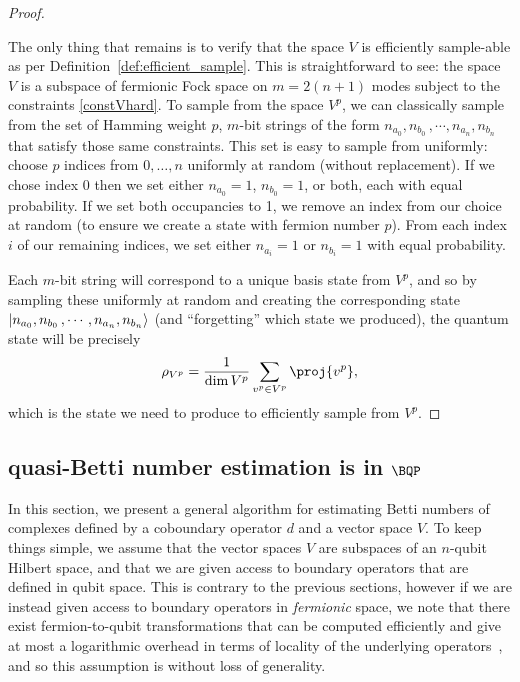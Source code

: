 \documentclass[11pt]{article}
\numberwithin{equation}{section}
\newcommand\equ[1] {\begin{equation}#1\end{equation}}
\renewcommand\( {\left(}
\renewcommand\) {\right)}
\begin{document}
\begin{proof}
	\
    
    The only thing that remains is to verify that the space $V$ is efficiently sample-able as per Definition~\ref{def:efficient_sample}. This is straightforward to see: the space $V$ is a subspace of fermionic Fock space on $m = 2(n+1)$ modes subject to the constraints \eqref{constVhard}. To sample from the space $V^p$, we can classically sample from the set of Hamming weight $p$, $m$-bit strings of the form $n_{a_{0}},n_{b_{0}}\,,\cdots, n_{a_{n}},n_{b_{n}}$ that satisfy those same constraints. This set is easy to sample from uniformly: choose $p$ indices from $0,\dots,n$ uniformly at random (without replacement). If we chose index $0$ then we set either $n_{a_0} = 1$, $n_{b_0} = 1$, or both, each with equal probability. If we set both occupancies to 1, we remove an index from our choice at random (to ensure we create a state with fermion number $p$). From each index $i$ of our remaining indices, we set either $n_{a_i} = 1$ or $n_{b_i} = 1$ with equal probability. 
    
    Each $m$-bit string will correspond to a unique basis state from $V^p$, and so by sampling these uniformly at random and creating the corresponding state $\ket{n_{a_{0}},n_{b_{0}}\,,\cdots, n_{a_{n}},n_{b_{n}}}$ (and ``forgetting'' which state we produced), the quantum state will be precisely 
    \equ{
        \rho_{V^p} = \frac{1}{\dim{V^p}} \sum_{v^p \in V^p} \proj{v^p},
    }
    which is the state we need to produce to efficiently sample from $V^p$.

\end{proof}

\subsection{{\sc quasi-Betti number estimation} is in $\BQP$}\label{sec:quantum_algorithms}
In this section, we present a general algorithm for estimating Betti numbers of complexes defined by a coboundary operator $d$ and a vector space $V$. To keep things simple, we assume that the vector spaces $V$ are subspaces of an $n$-qubit Hilbert space, and that we are given access to boundary operators that are defined in qubit space. This is contrary to the previous sections, however if we are instead given access to boundary operators in \emph{fermionic} space, we note that there exist fermion-to-qubit transformations that can be computed efficiently and give at most a logarithmic overhead in terms of locality of the underlying operators~\cite{bravyi2002fermionic, seeley2012bravyi}, and so this assumption is without loss of generality.
\end{document}
